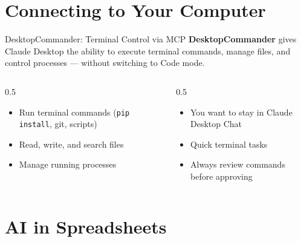 \documentclass[aspectratio=169]{beamer}
\begin{document}
\section{Connecting to Your Computer}

\begin{frame}{DesktopCommander: Terminal Control via MCP}
\textbf{DesktopCommander} gives Claude Desktop the ability to execute terminal commands, manage files, and control processes --- without switching to Code mode.
\vspace{0.3cm}
\begin{columns}[T]
\begin{column}{0.5\textwidth}
\begin{shadedbox}[title=\textbf{What It Can Do}]
\begin{itemize}\small
  \item Run terminal commands (\texttt{pip install}, git, scripts)
  \item Read, write, and search files
  \item Manage running processes
\end{itemize}
\end{shadedbox}
\end{column}
\begin{column}{0.5\textwidth}
\begin{shadedbox}[title=\textbf{When to Use It}]
\begin{itemize}\small
  \item You want to stay in Claude Desktop Chat
  \item Quick terminal tasks
  \item \alert{Always review commands before approving}
\end{itemize}
\end{shadedbox}
\end{column}
\end{columns}
\end{frame}

\section{AI in Spreadsheets}
\end{document}

